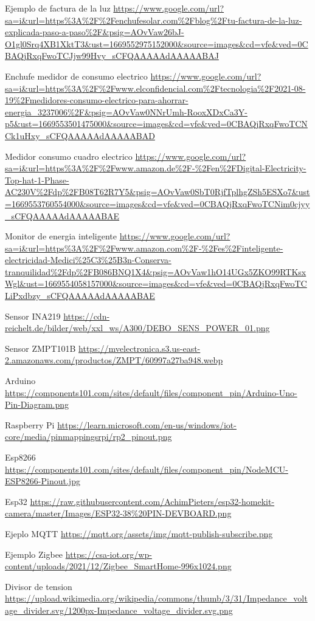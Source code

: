 \begin{thebibliography}{9}
Ejemplo de factura de la luz \url{https://www.google.com/url?sa=i&url=https%3A%2F%2Fenchufesolar.com%2Fblog%2Ftu-factura-de-la-luz-explicada-paso-a-paso%2F&psig=AOvVaw26bJ-O1gl0Srq4XB1XktT3&ust=1669552975152000&source=images&cd=vfe&ved=0CBAQjRxqFwoTCJjw99Hvy_sCFQAAAAAdAAAAABAJ}

Enchufe medidor de consumo electrico \url{https://www.google.com/url?sa=i&url=https%3A%2F%2Fwww.elconfidencial.com%2Ftecnologia%2F2021-08-19%2Fmedidores-consumo-electrico-para-ahorrar-energia_3237006%2F&psig=AOvVaw0NNrUmh-RooxXDxCa3Y-p5&ust=1669553501475000&source=images&cd=vfe&ved=0CBAQjRxqFwoTCNCk1uHxy_sCFQAAAAAdAAAAABAD}

Medidor consumo cuadro electrico \url{https://www.google.com/url?sa=i&url=https%3A%2F%2Fwww.amazon.de%2F-%2Fen%2FDigital-Electricity-Top-hat-1-Phase-AC230V%2Fdp%2FB08T62R7Y5&psig=AOvVaw0SbT0RjfTplhgZSh5ESXo7&ust=1669553760554000&source=images&cd=vfe&ved=0CBAQjRxqFwoTCNim0cjyy_sCFQAAAAAdAAAAABAE}

Monitor de energia inteligente \url{https://www.google.com/url?sa=i&url=https%3A%2F%2Fwww.amazon.com%2F-%2Fes%2Finteligente-electricidad-Medici%25C3%25B3n-Conserva-tranquilidad%2Fdp%2FB086BNQ1X4&psig=AOvVaw1hO14UGx5ZKO99RTKsxWgl&ust=1669554058157000&source=images&cd=vfe&ved=0CBAQjRxqFwoTCLiPxdbzy_sCFQAAAAAdAAAAABAE}

Sensor INA219 \url{https://cdn-reichelt.de/bilder/web/xxl_ws/A300/DEBO_SENS_POWER_01.png}

Sensor ZMPT101B \url{https://mvelectronica.s3.us-east-2.amazonaws.com/productos/ZMPT/60997a27ba948.webp}

Arduino \url{https://components101.com/sites/default/files/component_pin/Arduino-Uno-Pin-Diagram.png}

Raspberry Pi \url{https://learn.microsoft.com/en-us/windows/iot-core/media/pinmappingsrpi/rp2_pinout.png}

Esp8266 \url{https://components101.com/sites/default/files/component_pin/NodeMCU-ESP8266-Pinout.jpg}

Esp32 \url{https://raw.githubusercontent.com/AchimPieters/esp32-homekit-camera/master/Images/ESP32-38%20PIN-DEVBOARD.png}

Ejeplo MQTT \url{https://mqtt.org/assets/img/mqtt-publish-subscribe.png}

Ejemplo Zigbee \url{https://csa-iot.org/wp-content/uploads/2021/12/Zigbee_SmartHome-996x1024.png}

Divisor de tension \url{https://upload.wikimedia.org/wikipedia/commons/thumb/3/31/Impedance_voltage_divider.svg/1200px-Impedance_voltage_divider.svg.png}

\end{thebibliography}
